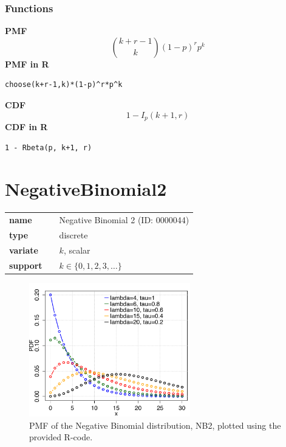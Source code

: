 \subsubsection*{Functions}

\smallskip \noindent \hspace{.2cm} \textbf{PMF} 
\begin{equation*}\binom {k+r-1}k (1-p)^r p^k\end{equation*}
\smallskip \noindent \hspace{.2cm} \textbf{PMF in R}  
\begin{verbatim}choose(k+r-1,k)*(1-p)^r*p^k\end{verbatim}
\smallskip \noindent \hspace{.2cm} \textbf{CDF} 
\begin{equation*}1 - I_{p}(k+1, r)\end{equation*}
\smallskip \noindent \hspace{.2cm} \textbf{CDF in R} 
\begin{verbatim}1 - Rbeta(p, k+1, r)\end{verbatim}
\smallskip\section*{NegativeBinomial2} 

  \bigskip 

\begin{tabular}{p{2cm}cl}
\textbf{name} & & Negative Binomial 2 (ID: 0000044)\\ 
 
\textbf{type} & & discrete \\ 

\textbf{variate} & & $k$, scalar \\ 

\textbf{support} & & $k \in \{0,1,2,3,\dots\}$
\end{tabular}
\begin{figure}[htb!]
\centering
  \includegraphics[width=70mm]{pics/NB2_pmf.pdf}
 \caption{PMF of the Negative Binomial distribution, NB2,
plotted using the provided R-code.}
 \label{fig:NB2pmf}
\end{figure}

